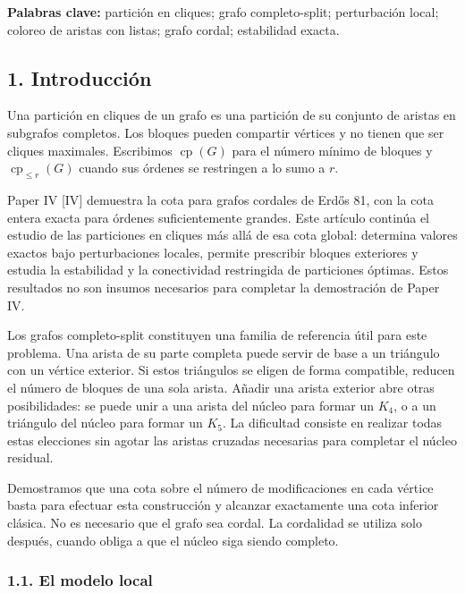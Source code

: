 \documentclass[spanish,11pt,a4paper]{article}
\begin{document}
\textbf{Palabras clave:} partición en cliques; grafo completo-split;
perturbación local; coloreo de aristas con listas; grafo cordal;
estabilidad exacta.

\subsection{1. Introducción}\label{introducciuxf3n}

Una partición en cliques de un grafo es una partición de su conjunto de
aristas en subgrafos completos. Los bloques pueden compartir vértices y
no tienen que ser cliques maximales. Escribimos \(\operatorname{cp}(G)\)
para el número mínimo de bloques y \(\operatorname{cp}_{\le r}(G)\)
cuando sus órdenes se restringen a lo sumo a \(r\).

Paper IV {[}IV{]} demuestra la cota para grafos cordales de Erdős 81,
con la cota entera exacta para órdenes suficientemente grandes. Este
artículo continúa el estudio de las particiones en cliques más allá de
esa cota global: determina valores exactos bajo perturbaciones locales,
permite prescribir bloques exteriores y estudia la estabilidad y la
conectividad restringida de particiones óptimas. Estos resultados no son
insumos necesarios para completar la demostración de Paper IV.

Los grafos completo-split constituyen una familia de referencia útil
para este problema. Una arista de su parte completa puede servir de base
a un triángulo con un vértice exterior. Si estos triángulos se eligen de
forma compatible, reducen el número de bloques de una sola arista.
Añadir una arista exterior abre otras posibilidades: se puede unir a una
arista del núcleo para formar un \(K_4\), o a un triángulo del núcleo
para formar un \(K_5\). La dificultad consiste en realizar todas estas
elecciones sin agotar las aristas cruzadas necesarias para completar el
núcleo residual.

Demostramos que una cota sobre el número de modificaciones en cada
vértice basta para efectuar esta construcción y alcanzar exactamente una
cota inferior clásica. No es necesario que el grafo sea cordal. La
cordalidad se utiliza solo después, cuando obliga a que el núcleo siga
siendo completo.

\subsubsection{1.1. El modelo local}\label{el-modelo-local}
\end{document}
